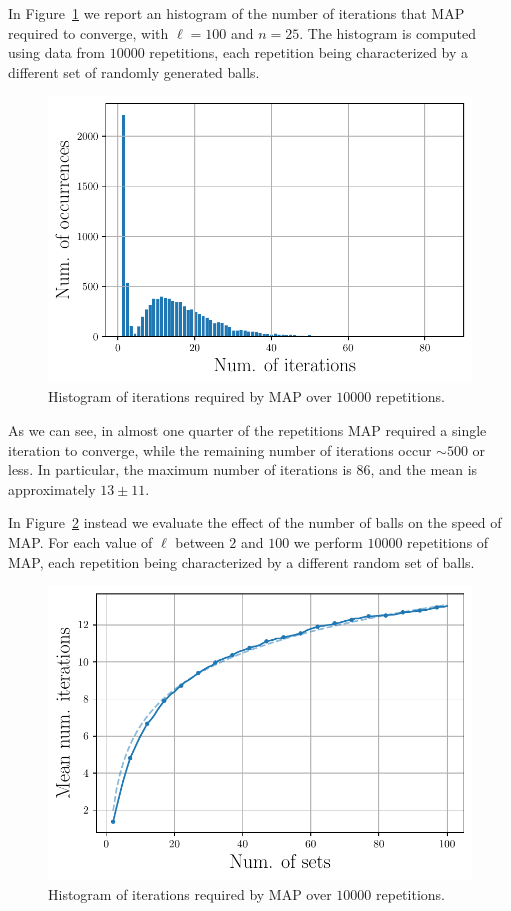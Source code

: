 \documentclass{article}
\begin{document}
In Figure~\ref{fig:map-histogram} we report an histogram of the number of iterations that MAP required to converge, with $\ell = 100$ and $n = 25$. The histogram is computed using data from $10000$ repetitions, each repetition being characterized by a different set of randomly generated balls.

\begin{figure}[!ht]
\centering
\includegraphics[width = 0.9\columnwidth]{Figures/MAP_histogram}
\caption{Histogram of iterations required by MAP over $10000$ repetitions.}
\label{fig:map-histogram}
\end{figure}

As we can see, in almost one quarter of the repetitions MAP required a single iteration to converge, while the remaining number of iterations occur $\sim 500$ or less. In particular, the maximum number of iterations is $86$, and the mean is approximately $13 \pm 11$.

In Figure~\ref{fig:map-changing-d} instead we evaluate the effect of the number of balls on the speed of MAP. For each value of $\ell$ between $2$ and $100$ we perform $10000$ repetitions of MAP, each repetition being characterized by a different random set of balls.

\begin{figure}[!ht]
\centering
\includegraphics[width = 0.9\columnwidth]{Figures/MAP_changing_d}
\caption{Histogram of iterations required by MAP over $10000$ repetitions.}
\label{fig:map-changing-d}
\end{figure}
\end{document}
